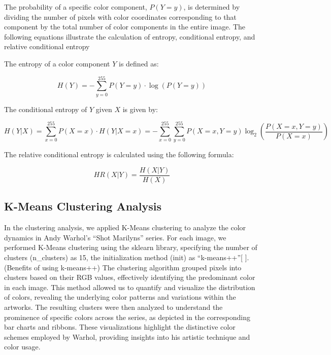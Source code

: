 \documentclass{article}
\begin{document}
The probability of a specific color component, \(P(Y=y)\), is determined
by dividing the number of pixels with color coordinates corresponding to
that component by the total number of color components in the entire
image. The following equations illustrate the calculation of entropy,
conditional entropy, and relative conditional entropy

The entropy of a color component \(Y\) is defined as:

\begin{equation}
    H(Y) = - \sum_{y=0}^{255} P(Y = y) \cdot \log(P(Y = y))
\end{equation}

The conditional entropy of \(Y\) given \(X\) is given by:

\begin{equation}
    H(Y|X) = \sum_{x=0}^{255} P(X = x) \cdot H(Y|X = x) = - \sum_{x=0}^{255} \sum_{y=0}^{255} P(X = x, Y = y) \log_2 \left(\frac{P(X = x, Y = y)}{P(X = x)}\right)
\end{equation}

The relative conditional entropy is calculated using the following
formula:

\begin{equation}
    HR(X|Y) = \frac{H(X|Y)}{H(X)}
\end{equation}

\hypertarget{k-means-clustering-analysis}{%
\subsection{K-Means Clustering
Analysis}\label{k-means-clustering-analysis}}

In the clustering analysis, we applied K-Means clustering to analyze the
color dynamics in Andy Warhol's ``Shot Marilyns'' series. For each
image, we performed K-Means clustering using the sklearn library,
specifying the number of clusters (n\_clusters) as 15, the
initialization method (init) as ``k-means++''{[} {]}.(Benefits of using
k-means++) The clustering algorithm grouped pixels into clusters based
on their RGB values, effectively identifying the predominant color in
each image. This method allowed us to quantify and visualize the
distribution of colors, revealing the underlying color patterns and
variations within the artworks. The resulting clusters were then
analyzed to understand the prominence of specific colors across the
series, as depicted in the corresponding bar charts and ribbons. These
visualizations highlight the distinctive color schemes employed by
Warhol, providing insights into his artistic technique and color usage.
\end{document}
